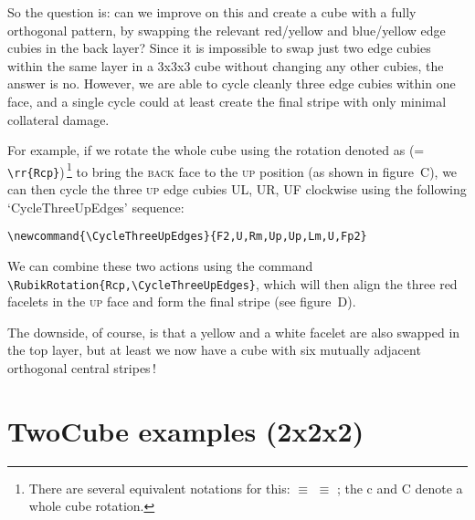 \documentclass[a4paper]{article}
\newcommand{\cubenumber}[1]{\strut\raisebox{1cm}{#1}}
\begin{document}
\bigskip

\RubikCubeSolved
\RubikRotation{\StripesOrtho}
\cubenumber{A}
\hspace{3cm}
\cubenumber{B}

\bigskip

{\noindent}So the question is: can we improve on this and create a cube 
with a fully orthogonal pattern, by  swapping the relevant red/yellow 
and blue/yellow edge cubies in the back layer? Since it is impossible 
to swap just two edge cubies within the same layer in a 3x3x3 cube 
without changing any other cubies, the answer is no. However, we are 
able to cycle cleanly three edge cubies within one face, and a single  
cycle could at least create the final stripe with only minimal collateral
damage.

For example, if we rotate the whole cube using the rotation denoted 
as   (= \verb!\rr{Rcp}!)\,\footnote{There are several equivalent
notations for this:  $\equiv$  $\equiv$ ; 
the c and C denote a whole cube rotation.} to bring the \textsc{back} face to 
the \textsc{up} position (as shown in figure~C), we can then cycle the three 
\textsc{up} edge cubies UL, UR, UF clockwise using the following
`CycleThreeUpEdges' sequence:
\begin{verbatim}
\newcommand{\CycleThreeUpEdges}{F2,U,Rm,Up,Up,Lm,U,Fp2} 
\end{verbatim}
We can combine these two actions using the command 
\verb!\RubikRotation{Rcp,\CycleThreeUpEdges}!, which will then align the 
three red facelets in the \textsc{up} face  and form the final stripe 
(see figure~D). 

\RubikCubeSolved
{} 
\cubenumber{C}
\DrawRubikCubeRU
\hspace{3cm}
\RubikRotation{\CycleThreeUpEdges}
\cubenumber{D}
\DrawRubikCubeSF

\medskip

The downside, of course, is that a yellow and a white facelet are also 
swapped in the top layer, but at least we now have a cube with six 
mutually adjacent orthogonal central stripes\,!


\pagebreak


\section{TwoCube examples (2x2x2)} 
\end{document}
